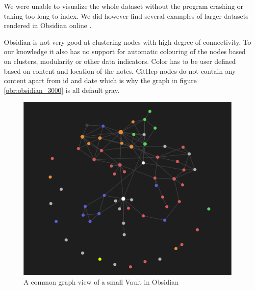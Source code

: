 We were unable to visualize the whole dataset without the program crashing or taking too long to index.
We did however find several examples of larger datasets rendered in Obsidian online
\cite{obsidian_reddit_large_graph}.

Obsidian is not very good at clustering nodes with high degree of connectivity.
To our knowledge it also has no support for automatic colouring of the nodes based on clusters, modularity  or other data indicators.
Color has to be user defined based on content and location of the notes.
CitHep nodes do not contain any content apart from id and date which is why the graph in figure \ref{obr:obsidian_3000} is all default gray.

\begin{figure}[p]\centering
  \includegraphics[width=140mm, keepaspectratio]{img/obsidian_common_notes.png}
  \caption{A common graph view of a small Vault in Obsidian}
  \label{obr:obsidian_common}
\end{figure}


